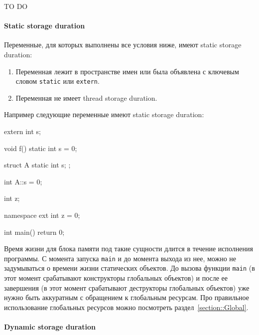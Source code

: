 \documentclass{article}
\begin{document}

TO DO


\paragraph{Static storage duration}

Переменные, для которых выполнены все условия ниже, имеют static storage duration:
\begin{enumerate}
\item Переменная лежит в пространстве имен или была объявлена с ключевым словом \verb"static" или \verb"extern".

\item Переменная не имеет thread storage duration.
\end{enumerate}
Например следующие переменные имеют static storage duration:
\begin{cppcode}[numbers = none]
extern int s;

void f() {
  static int s = 0;
}

struct A {
  static int s;
};

int A::s = 0;

int z;

namespace ext {
int z = 0;
}

int main() {
  return 0;
}
\end{cppcode}
Время жизни для блока памяти под такие сущности длится в течение исполнения программы.
С момента запуска \verb"main" и до момента выхода из нее, можно не задумываться о времени жизни статических объектов.
До вызова функции \verb"main" (в этот момент срабатывают конструкторы глобальных объектов) и после ее завершения (в этот момент срабатывают деструкторы глобальных объектов) уже нужно быть аккуратным с обращением к глобальным ресурсам.
Про правильное использование глобальных ресурсов можно посмотреть раздел~\ref{section::Global}.

\paragraph{Dynamic storage duration}
\end{document}
